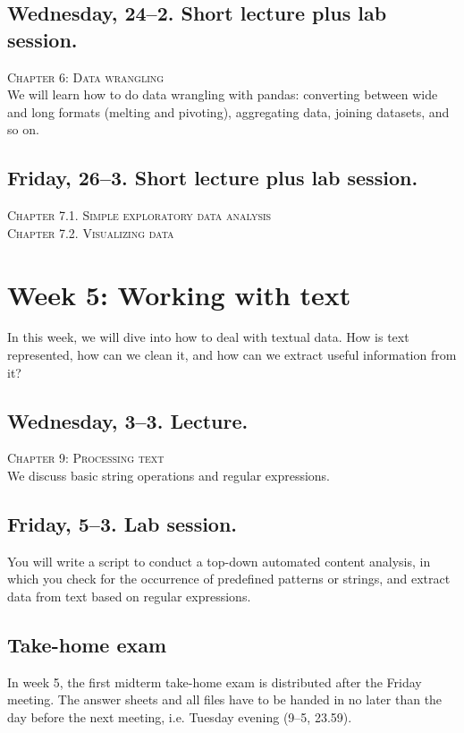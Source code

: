 \subsection*{Wednesday, 24--2. Short lecture plus lab session.}
\textsc{ Chapter 6: Data wrangling}\\
We will learn how to do data wrangling with pandas: converting between wide and long formats (melting and pivoting), aggregating data, joining datasets, and so on.

\subsection*{Friday, 26--3.  Short lecture plus lab session.}
\textsc{ Chapter 7.1. Simple exploratory data analysis}\\
\textsc{ Chapter 7.2. Visualizing data}\\




\section*{Week 5: Working with text}
In this week, we will dive into how to deal with textual data. How is text represented, how can we clean it, and how can we extract useful information from it?

\subsection*{Wednesday, 3--3. Lecture.}
\textsc{ Chapter 9: Processing text}\\
We discuss basic string operations and regular expressions.


\subsection*{Friday, 5--3. Lab session.}
You will write a script to conduct a top-down automated content analysis, in which you check for the occurrence of predefined patterns or strings, and extract data from text based on regular expressions.



\subsection*{Take-home exam}
In week 5, the first midterm take-home exam is distributed after the Friday meeting. The answer sheets and all files have to be handed in no later than the day before the next meeting, i.e. Tuesday evening (9--5, 23.59).




